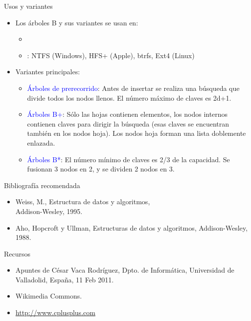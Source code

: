 \documentclass[handout]{beamer} %
\newcommand{\blue}[1]{\textcolor{blue}{#1}}
\newcommand{\redb}[1]{{\color{red!70!black}{#1}}}
\begin{document}
\begin{frame}{Usos y variantes}
    \begin{itemize}
        \item<1-> Los árboles B y sus variantes se usan en:
        \begin{itemize}
            \item \redb{Gestores de bases de datos}
            \item \redb{Sistemas de archivos}: NTFS (Windows), HFS+ (Apple), btrfs, Ext4 (Linux)
        \end{itemize}
        \item<2-> Variantes principales:
        \begin{itemize}
            \item \blue{Árboles de prerecorrido}: Antes de insertar se realiza una búsqueda que divide todos los nodos llenos. El número máximo de claves es 2d+1.
            \item \blue{Árboles B+}: Sólo las hojas contienen elementos, los nodos internos contienen claves para dirigir la búsqueda (esas claves se encuentran también en los nodos hoja). Los nodos hoja forman una lista doblemente enlazada.
            \item \blue{Árboles B*}: El número mínimo de claves es 2/3 de la capacidad. Se fusionan 3 nodos en 2, y se dividen 2 nodos en 3.
        \end{itemize}
    \end{itemize}
\end{frame}


\begin{frame}
 \begin{block}{Bibliografía recomendada}
  \begin{itemize}
    \item Weiss, M., Estructura de datos y algoritmos,\\ Addison-Wesley, 1995.
    \item Aho, Hopcroft y Ullman, Estructuras de datos y algoritmos, Addison-Wesley, 1988.
  \end{itemize}
 \end{block}
 \begin{block}{Recursos}
  \begin{itemize}
    \item Apuntes de César Vaca Rodríguez, Dpto. de Informática, Universidad de Valladolid, España, 11 Feb 2011.
    \item Wikimedia Commons.
    \item \url{http://www.cplusplus.com}
  \end{itemize}
 \end{block}
\end{frame}
\end{document}
